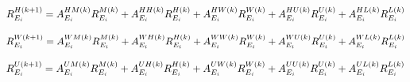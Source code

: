 
\begin{equation}
\small R_{{E_{i}}}^{H(k+1)} = A_{E_{i}}^{HM(k)}R_{{E_{i}}}^{M(k)} + A_{E_{i}}^{HH(k)}R_{{E_{i}}}^{H(k)} + A_{E_{i}}^{HW(k)}R_{{E_{i}}}^{W(k)}+ A_{E_{i}}^{HU(k)}R_{{E_{i}}}^{U(k)} + A_{E_{i}}^{HL(k)}R_{{E_{i}}}^{L(k)}
\end{equation}




\begin{equation}
\small R_{{E_{i}}}^{W(k+1)} = A_{E_{i}}^{WM(k)}R_{{E_{i}}}^{M(k)} + A_{E_{i}}^{WH(k)}R_{{E_{i}}}^{H(k)} + A_{E_{i}}^{WW(k)}R_{{E_{i}}}^{W(k)}+ A_{E_{i}}^{WU(k)}R_{{E_{i}}}^{U(k)} + A_{E_{i}}^{WL(k)}R_{{E_{i}}}^{L(k)}
\end{equation}


\begin{equation}
\small R_{{E_{i}}}^{U(k+1)} = A_{E_{i}}^{UM(k)}R_{{E_{i}}}^{M(k)} + A_{E_{i}}^{UH(k)}R_{{E_{i}}}^{H(k)} + A_{E_{i}}^{UW(k)}R_{{E_{i}}}^{W(k)}+ A_{E_{i}}^{UU(k)}R_{{E_{i}}}^{U(k)} + A_{E_{i}}^{UL(k)}R_{{E_{i}}}^{L(k)}
\end{equation}



